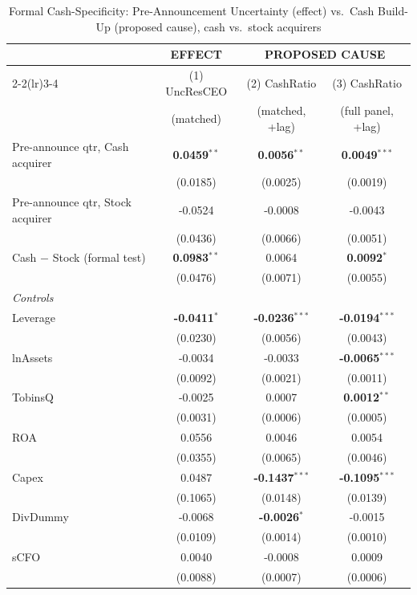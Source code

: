 \begin{table}[htbp]
\centering
\caption{Formal Cash-Specificity: Pre-Announcement Uncertainty (effect) vs.\ Cash Build-Up (proposed cause), cash vs.\ stock acquirers}
\label{tab:empire_cashspec}
\scriptsize
\begin{tabular}{lccc}
\toprule
 & \multicolumn{1}{c}{EFFECT} & \multicolumn{2}{c}{PROPOSED CAUSE} \\
\cmidrule(lr){2-2}\cmidrule(lr){3-4}
 & (1) UncResCEO & (2) CashRatio & (3) CashRatio \\
 & (matched) & (matched, +lag) & (full panel, +lag) \\
\midrule
Pre-announce qtr, Cash acquirer & \textbf{0.0459}$^{**}$ & \textbf{0.0056}$^{**}$ & \textbf{0.0049}$^{***}$ \\
 & (0.0185) & (0.0025) & (0.0019) \\
Pre-announce qtr, Stock acquirer & -0.0524 & -0.0008 & -0.0043 \\
 & (0.0436) & (0.0066) & (0.0051) \\
\midrule
Cash $-$ Stock (formal test) & \textbf{0.0983}$^{**}$ & 0.0064 & \textbf{0.0092}$^{*}$ \\
 & (0.0476) & (0.0071) & (0.0055) \\
\midrule
\multicolumn{4}{l}{\textit{Controls}} \\
Leverage & \textbf{-0.0411}$^{*}$ & \textbf{-0.0236}$^{***}$ & \textbf{-0.0194}$^{***}$ \\
 & (0.0230) & (0.0056) & (0.0043) \\
lnAssets & -0.0034 & -0.0033 & \textbf{-0.0065}$^{***}$ \\
 & (0.0092) & (0.0021) & (0.0011) \\
TobinsQ & -0.0025 & 0.0007 & \textbf{0.0012}$^{**}$ \\
 & (0.0031) & (0.0006) & (0.0005) \\
ROA & 0.0556 & 0.0046 & 0.0054 \\
 & (0.0355) & (0.0065) & (0.0046) \\
Capex & 0.0487 & \textbf{-0.1437}$^{***}$ & \textbf{-0.1095}$^{***}$ \\
 & (0.1065) & (0.0148) & (0.0139) \\
DivDummy & -0.0068 & \textbf{-0.0026}$^{*}$ & -0.0015 \\
 & (0.0109) & (0.0014) & (0.0010) \\
sCFO & 0.0040 & -0.0008 & 0.0009 \\
 & (0.0088) & (0.0007) & (0.0006) \\

\end{tabular}
\end{table}
